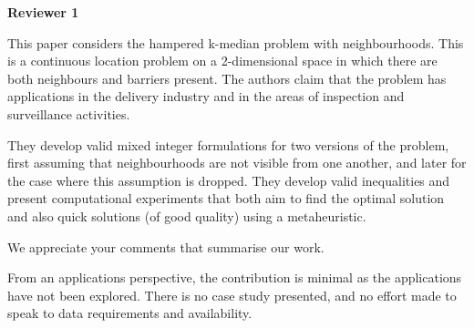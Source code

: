 \documentclass{article}
\newenvironment{reviewer}{\setcounter{pointcounter}{1}}{}
\newcommand{\point}{\text{{\selectfont \thepointcounter} \stepcounter{pointcounter}}}
\begin{document}
	\begin{reviewer}
		
		\begin{tcolorbox}[breakable,enhanced,coltitle=black,colback=red!75!black,colframe=red!75!black,borderline={1pt}{0pt}{black},boxrule=0pt]
			\textbf{Reviewer 1}
		\end{tcolorbox}
		
		\begin{itshape}
			This paper considers the hampered k-median problem with neighbourhoods. This is a continuous location problem on a 2-dimensional space in which there are both neighbours and barriers present. The authors claim that the problem has applications in the delivery industry and in the areas of inspection and surveillance activities.
			
			They develop valid mixed integer formulations for two versions of the problem, first assuming that neighbourhoods are not visible from one another, and later for the case where this assumption is dropped. They develop valid inequalities and present computational experiments that both aim to find the optimal solution and also quick solutions (of good quality) using a metaheuristic.
		\end{itshape}
		
		\begin{tcolorbox}[breakable,enhanced,coltitle=black,colback=red!5!white,colframe=red!75!black,title=\textbf{Answer R1.\point},borderline={1pt}{0pt}{black},boxrule=0pt]
			We appreciate your comments that summarise our work.
		\end{tcolorbox}
		
		\begin{itshape}
			From an applications perspective, the contribution is minimal as the applications have not been explored. There is no case study presented, and no effort made to speak to data requirements and availability.
		\end{itshape}
		

\end{reviewer}
\end{document}
